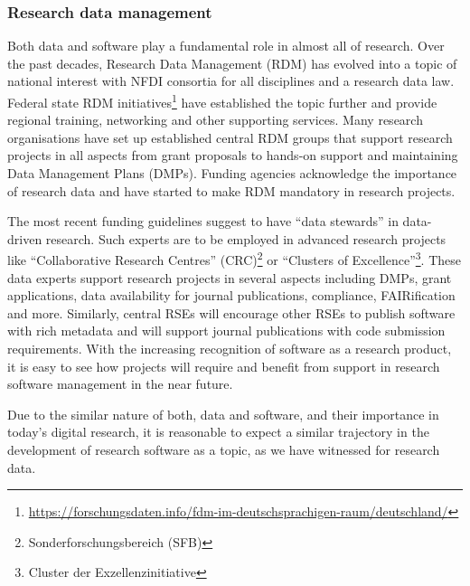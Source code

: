 \documentclass[a4paper]{article}
\begin{document}
\subsubsection{Research data management}
Both data and software play a fundamental role in almost all of research.
Over the past decades, Research Data Management (RDM) has evolved into a topic of national interest with NFDI consortia for all disciplines and a research data law.
Federal state RDM initiatives\footnote{\url{https://forschungsdaten.info/fdm-im-deutschsprachigen-raum/deutschland/}} have established the topic further and provide regional training, networking and other supporting services.
Many research organisations have set up established central RDM groups that support research projects in all aspects from grant proposals to hands-on support and maintaining Data Management Plans (DMPs).
Funding agencies acknowledge the importance of research data and have started to make RDM mandatory in research projects.

The most recent funding guidelines suggest to have “data stewards” in data-driven research.
Such experts are to be employed in advanced research projects like “Collaborative Research Centres” (CRC)\footnote{Sonderforschungsbereich (SFB)} or “Clusters of Excellence”\footnote{Cluster der Exzellenzinitiative}.
These data experts support research projects in several aspects including DMPs, grant applications, data availability for journal publications, compliance, FAIRification and more.
Similarly, central RSEs will encourage other RSEs to publish software with rich metadata and will support journal publications with code submission requirements.
With the increasing recognition of software as a research product, it is easy to see how projects will require and benefit from support in research software management in the near future.

Due to the similar nature of both, data and software, and their importance in today's digital research, it is reasonable to expect a similar trajectory in the development of research software as a topic, as we have witnessed for research data.
\end{document}
